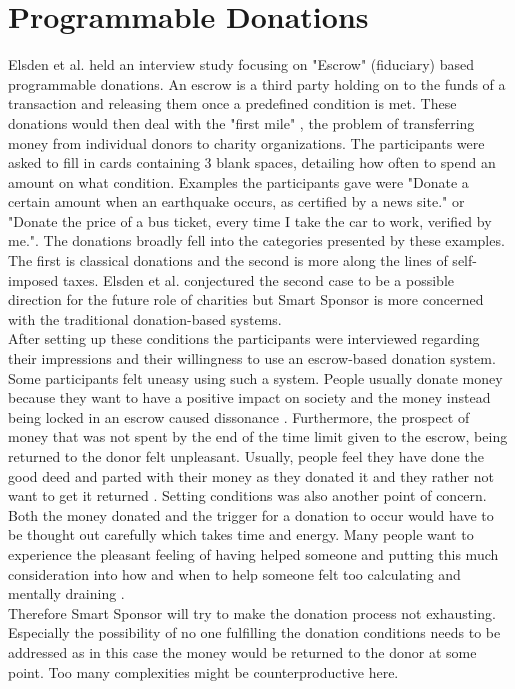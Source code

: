 \section{Programmable Donations}
Elsden et al.\cite{progDon} held an interview study focusing on "Escrow" (fiduciary) based programmable donations. An escrow is a third party holding on to the funds of a transaction and releasing them once a predefined condition is met. These donations would then deal with the "first mile" \cite{progDon}, the problem of transferring money from individual donors to charity organizations. The participants were asked to fill in cards containing 3 blank spaces, detailing how often to spend an amount on what condition. Examples the participants gave were  "Donate a certain amount when an earthquake occurs, as certified by a news site." or "Donate the price of a bus ticket, every time I take the car to work, verified by me."\cite{progDon}.
The donations broadly fell into the categories presented by these examples. The first is classical donations and the second is more along the lines of self-imposed taxes. Elsden et al. conjectured the second case to be a possible direction for the future role of charities but Smart Sponsor is more concerned with the traditional donation-based systems.
\\
After setting up these conditions the participants were interviewed regarding their impressions and their willingness to use an escrow-based donation system. Some participants felt uneasy using such a system. People usually donate money because they want to have a positive impact on society and the money instead being locked in an escrow caused dissonance \cite{progDon}. Furthermore, the prospect of money that was not spent by the end of the time limit given to the escrow, being returned to the donor felt unpleasant. Usually, people feel they have done the good deed and parted with their money as they donated it and they rather not want to get it returned \cite{progDon}. Setting conditions was also another point of concern. Both the money donated and the trigger for a donation to occur would have to be thought out carefully which takes time and energy. Many people want to experience the pleasant feeling of having helped someone and putting this much consideration into how and when to help someone felt too calculating and mentally draining \cite{progDon}. \\
Therefore Smart Sponsor will try to make the donation process not exhausting. Especially the possibility of no one fulfilling the donation conditions needs to be addressed as in this case the money would be returned to the donor at some point. Too many complexities might be counterproductive here.
